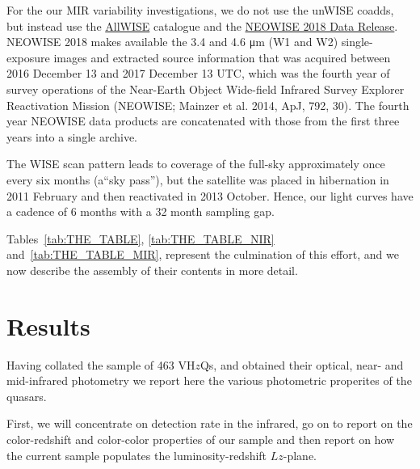 \documentclass[usenatbib]{mnras}
\begin{document}
For the our MIR variability investigations, we do not use the unWISE coadds, but instead use 
the \href{http://wise2.ipac.caltech.edu/docs/release/allwise/}{AllWISE} catalogue and the \href{http://wise2.ipac.caltech.edu/docs/release/neowise/neowise_2018_release_intro.html}{NEOWISE 2018 Data Release}. NEOWISE 2018 makes available the 3.4 and 4.6 μm (W1 and W2) single-exposure images and extracted source information that was acquired between 2016 December 13 and 2017 December 13 UTC, which was the fourth year of survey operations of the Near-Earth Object Wide-field Infrared Survey Explorer Reactivation Mission (NEOWISE; Mainzer et al. 2014, ApJ, 792, 30). The fourth year NEOWISE data products are concatenated with those from the first three years into a single archive.

The WISE scan pattern leads to coverage of the full-sky approximately once every six months (a``sky pass''), but the satellite was placed in hibernation in 2011 February and then reactivated in 2013 October. Hence, our light curves have a cadence of 6 months with a 32 month sampling gap.

Tables~\ref{tab:THE_TABLE}, \ref{tab:THE_TABLE_NIR} and~\ref{tab:THE_TABLE_MIR}, represent the culmination of this effort, and we now describe the assembly of their contents in more detail.  





\section{Results}
Having collated the sample of 463 VH$z$Qs, and obtained their optical,
near- and mid-infrared photometry we report here the various
photometric properites of the quasars.

First, we will concentrate on detection rate in the infrared, go on to
report on the color-redshift and color-color properties of our sample
and then report on how the current sample populates the
luminosity-redshift $Lz$-plane.
\end{document}
